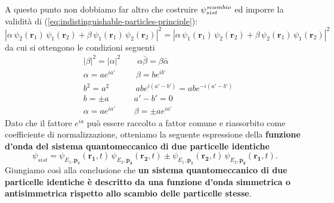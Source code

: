A questo punto non dobbiamo far altro che costruire $ \mathlarger{\psi}^{scambio}_{sist}$
ed imporre la validità di (\ref{eq:indistinguishable-particles-principle}):
\[
	|\alpha\, \psi_2(\bm{r}_1)\,\psi_1(\bm{r}_2) + \beta\, \psi_1(\bm{r}_1)\,\psi_2(\bm{r}_2)|^2 =
	|\alpha\, \psi_1(\bm{r}_1)\,\psi_2(\bm{r}_2) + \beta\, \psi_2(\bm{r}_1)\,\psi_1(\bm{r}_2)|^2
\]
da cui si ottengono le condizioni seguenti
\begin{align*}
	&|\beta|^{2} = |\alpha|^{2} \qquad \alpha \bar{\beta} = \beta \bar{\alpha}  \\
	&\alpha = ae^{ ia' } \quad \ \  \quad  \beta = b e^{ ib' }  \\
	&b^{2} = a^{2} \qquad \quad \, ab e^{ i(a'-b') } = abe^{ -i(a'-b') } \\
	&b = \pm a \qquad \quad a'-b'=0 \\
	&\alpha = a e^{ ia' } \qquad \ \beta = \pm ae^{ ia' }
\end{align*}
Dato che il fattore $ e^{ia}$ può essere raccolto a fattor comune e riassorbito come
coefficiente di normalizzazione, otteniamo la seguente espressione della \textbf{funzione d’onda del sistema quantomeccanico
di due particelle identiche}
\begin{equation}
	\psi_{sist} = \psi_{E_1, \bm{p_1}} (\bm{r_1}, t) \, \psi_{E_2, \bm{p_2}} (\bm{r_2}, t) \pm \psi_{E_1, \bm{p_1}} (\bm{r_2}, t) \, \psi_{E_2, \bm{p_2}} (\bm{r_1}, t).
   \label{eq:identical-particles-wave-function}
\end{equation}
Giungiamo così alla conclusione che \textbf{un sistema quantomeccanico di due particelle identiche è descritto da una funzione
d’onda simmetrica o antisimmetrica rispetto allo scambio delle particelle stesse}.

